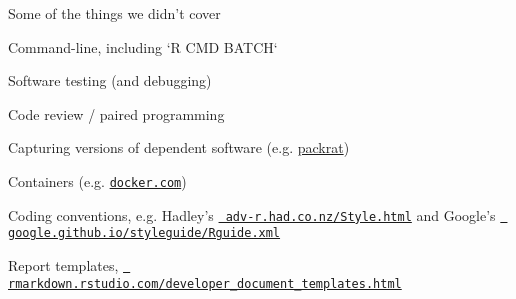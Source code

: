 \documentclass[12pt,t]{beamer}
\begin{document}
\begin{frame}[c]{Some of the things we didn't cover}

  \bi
\item Command-line, including `R CMD BATCH`
\item Software testing (and debugging)
\item Code review / paired programming
\item Capturing versions of dependent software (e.g.
  \href{https://rstudio.github.io/packrat}{packrat})
\item Containers (e.g. \href{https://www.docker.com}{\tt \footnotesize docker.com})
\item Coding conventions, e.g.
  Hadley's \href{http://adv-r.had.co.nz/Style.html}{\tt \footnotesize
    adv-r.had.co.nz/Style.html} and
  Google's
  \href{https://google.github.io/styleguide/Rguide.xml}{\tt
      \footnotesize google.github.io/styleguide/Rguide.xml}
\item Report templates,
  \href{http://rmarkdown.rstudio.com/developer_document_templates.html}{\tt
    \footnotesize rmarkdown.rstudio.com/developer\_document\_templates.html}

  \ei


\end{frame}
\end{document}
